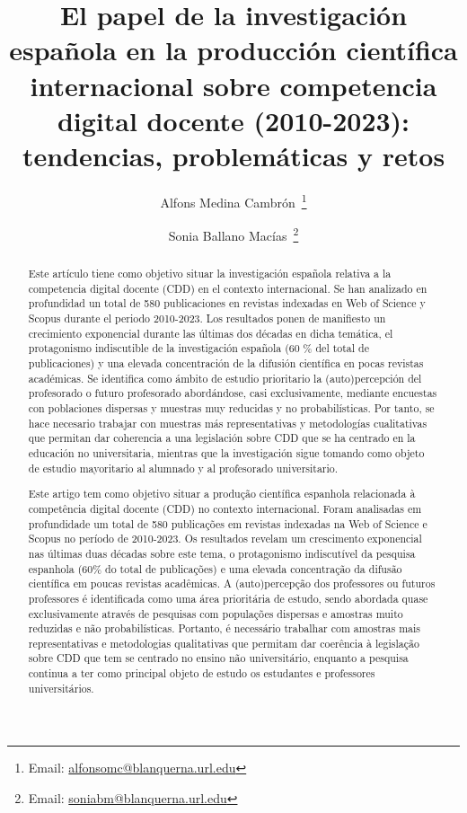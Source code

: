 \documentclass[spanish]{textolivre}
\title{El papel de la investigación española en la producción científica internacional sobre competencia digital docente (2010-2023): tendencias, problemáticas y retos}
\author[1]{Alfons Medina Cambrón~\orcid{0000-0001-8886-4564}\thanks{Email: \href{mailto:alfonsomc@blanquerna.url.edu}{alfonsomc@blanquerna.url.edu}}}
\author[1]{Sonia Ballano Macías~\orcid{0000-0002-6322-1383}\thanks{Email: \href{mailto:soniabm@blanquerna.url.edu}{soniabm@blanquerna.url.edu}}}
\affil[1]{Universidad Ramon Llull, Facultad de Comunicación y Relaciones Internacionales Blanquerna, Barcelona, España.}
\begin{document}
\maketitle

\begin{polyabstract}
\begin{abstract}
Este artículo tiene como objetivo situar la investigación española relativa a la competencia digital docente (CDD) en el contexto internacional. Se han analizado en profundidad un total de 580 publicaciones en revistas indexadas en Web of Science y Scopus durante el periodo 2010-2023. Los resultados ponen de manifiesto un crecimiento exponencial durante las últimas dos décadas en dicha temática, el protagonismo indiscutible de la investigación española (60 \% del total de publicaciones) y una elevada concentración de la difusión científica en pocas revistas académicas. Se identifica como ámbito de estudio prioritario la (auto)percepción del profesorado o futuro profesorado abordándose, casi exclusivamente, mediante encuestas con poblaciones dispersas y muestras muy reducidas y no probabilísticas. Por tanto, se hace necesario trabajar con muestras más representativas y metodologías cualitativas que permitan dar coherencia a una legislación sobre CDD que se ha centrado en la educación no universitaria, mientras que la investigación sigue tomando como objeto de estudio mayoritario al alumnado y al profesorado universitario.

\end{abstract}

\begin{portuguese}
\begin{abstract}
Este artigo tem como objetivo situar a produção científica espanhola relacionada à competência digital docente (CDD) no contexto internacional. Foram analisadas em profundidade um total de 580 publicações em revistas indexadas na Web of Science e Scopus no período de 2010-2023. Os resultados revelam um crescimento exponencial nas últimas duas décadas sobre este tema, o protagonismo indiscutível da pesquisa espanhola (60\% do total de publicações) e uma elevada concentração da difusão científica em poucas revistas acadêmicas. A (auto)percepção dos professores ou futuros professores é identificada como uma área prioritária de estudo, sendo abordada quase exclusivamente através de pesquisas com populações dispersas e amostras muito reduzidas e não probabilísticas. Portanto, é necessário trabalhar com amostras mais representativas e metodologias qualitativas que permitam dar coerência à legislação sobre CDD que tem se centrado no ensino não universitário, enquanto a pesquisa continua a ter como principal objeto de estudo os estudantes e professores universitários.


\end{abstract}
\end{portuguese}
\end{polyabstract}
\end{document}
